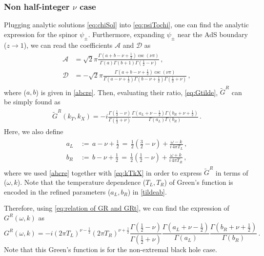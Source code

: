 \documentclass[11pt,a4paper]{article}
\begin{document}
\subsubsection{Non half-integer $\nu$ case} \label{subsec:Non half-integer GR Fermi}
Plugging analytic solutions \eqref{eq:chiSol} into \eqref{eq:psiTochi}, one can find the analytic expression for the spinor $\psi_{\pm}$. Furthermore, expanding $\psi_{\pm}$ near the AdS boundary ($z\rightarrow 1$), we can read the coefficients $\mathcal{A}$ and $\mathcal{D}$ as
\begin{align}\label{FRAD}
\begin{split}
    \mathcal{A} & =\sqrt{2}\pi \frac{ \Gamma(a+b-\nu+\frac{1}{2}) \csc{\left(\nu\pi\right)}}{\Gamma(a)\Gamma(b+1)\Gamma( \frac{1}{2}-\nu)}\,,\\
    \mathcal{D} & =-\sqrt{2}\pi \frac{ \Gamma(a+b-\nu+\frac{1}{2}) \csc{\left( \nu\pi \right)}}{\Gamma(a-\nu+\frac{1}{2}) \Gamma(b-\nu+\frac{1}{2}) \Gamma(\frac{1}{2}+\nu) }\,,
\end{split}
\end{align}
where ($a,b$) is given in \eqref{abcre}.
%
Then, evaluating their ratio, \eqref{eq:Gtilde}, $\tilde{G}^R$ can be simply found as
\begin{align}\label{eq:Gt Non-integer}
\begin{split}
    \tilde{G}^R(k_T, k_X) = -i \frac{\Gamma(\frac{1}{2}-\nu)}{\Gamma(\frac{1}{2}+\nu)}
    \frac{\Gamma({a}_L+\nu-\frac{1}{2})\Gamma({b}_R+\nu+\frac{1}{2})}{\Gamma({a}_L)\Gamma({b}_R)} \,.
\end{split}
\end{align}
Here, we also define
\begin{align}\label{tildeab}
\begin{split}
    a_L & \,:=\, a-\nu+\frac{1}{2} \,=\, \frac{1}{2}\left(\frac{3}{2} - \nu \right) + \frac{\omega - k}{i\,4\pi T_L} \,,  \\
    b_R & \,:=\, b-\nu+\frac{1}{2} \,=\, \frac{1}{2}\left(\frac{1}{2} - \nu \right) + \frac{\omega + k}{i\,4\pi T_R} \,,
\end{split}
\end{align}
where we used \eqref{abcre} together with \eqref{eq:kTkX} in order to express $\tilde{G}^R$ in terms of ($\omega, k$).
Note that the temperature dependence ($T_L, T_R$) of Green's function is encoded in the refined parameters ($a_L, b_R$) in \eqref{tildeab}. 

Therefore, using \eqref{eq:relation of GR and GRt}, we can find the expression of $G^R(\omega,k)$ as
\begin{equation} \label{eq:Fermionic GR Non-Int Finite T}
    G^R(\omega,k) = - i (2\pi T_L)^{\nu-\frac{1}{2}} (2\pi T_R)^{\nu + \frac{1}{2}} \frac{\Gamma(\frac{1}{2}-\nu)}{\Gamma(\frac{1}{2}+\nu)} \frac{\Gamma({a}_L+\nu-\frac{1}{2})}{\Gamma({a}_L)} \frac{\Gamma({b}_R+\nu+\frac{1}{2})}{\Gamma({b}_R)}\,.
\end{equation}
Note that this Green's function is for the non-extremal black hole case.\\
\end{document}
